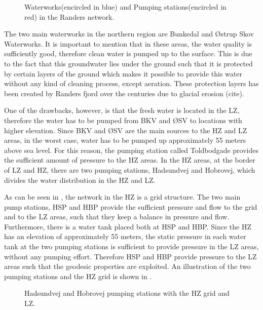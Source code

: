 \begin{figure}[H]
\centering
 
\caption{Waterworks(encircled in blue) and Pumping stations(encircled in red) in the Randers network.}
\label{fig:pumping_stations_and_waterworks}
\end{figure}

The two main waterworks in the northern region are Bunkedal and Østrup Skov Waterworks. It is important to mention that in these areas, the water quality is sufficiently good, therefore clean water is pumped up to the surface. This is due to the fact that this groundwater lies under the ground such that it is protected by certain layers of the ground which makes it possible to provide this water without any kind of cleaning process, except aeration. These protection layers has been created by Randers fjord over the centuries due to glacial erosion (cite).

One of the drawbacks, however, is that the fresh water is located in the LZ, therefore the water has to be pumped from BKV and ØSV to locations with higher elevation. Since BKV and ØSV are the main sources to the HZ and LZ areas, in the worst case, water has to be pumped up approximately 55 meters above sea level. For this reason, the pumping station called Toldbodgade provides the sufficient amount of pressure to the HZ areas. In the HZ areas, at the border of LZ and HZ, there are two pumping stations, Hadsundvej and Hobrovej, which divides the water distribution in the HZ and LZ. 

As can be seen in , the network in the HZ is a grid structure. The two main pump stations, HSP and HBP provide the sufficient pressure and flow to the grid and to the LZ areas, such that they keep a balance in pressure and flow. Furthermore, there is a water tank placed both at HSP and HBP. Since the HZ has an elevation of approximately 55 meters, the static pressure in each water tank at the two pumping stations is sufficient to provide pressure in the LZ areas, without any pumping effort. Therefore HSP and HBP provide pressure to the LZ areas such that the geodesic properties are exploited. An illustration of the two pumping stations and the HZ grid is shown in . 

\begin{figure}[H]
\centering

\caption{Hadsundvej and Hobrovej pumping stations with the HZ grid and LZ.}
\label{fig:HBP_HSP_grid}
\end{figure}

